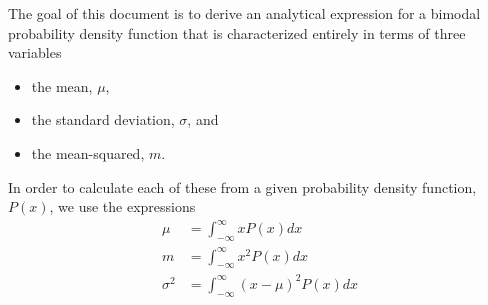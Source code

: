 \documentclass{article}
\begin{document}
The goal of this document is to derive an analytical expression for a bimodal probability density function that is characterized entirely in terms of three variables
\begin{itemize}
\item the mean, $\mu$,
\item the standard deviation, $\sigma$, and
\item the mean-squared, $m$.
\end{itemize}	
In order to calculate each of these from a given probability density function, $P(x)$, we use the expressions
\begin{align}
\mu & = \int_{-\infty}^{\infty} x P(x)dx\\
  m & = \int_{-\infty}^{\infty} x^2 P(x)dx\\
\sigma^2 & = \int_{-\infty}^{\infty} \left(x-\mu\right)^2 P(x)dx
\end{align}
\end{document}
